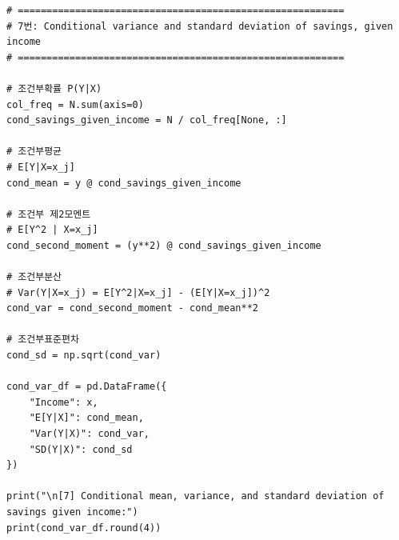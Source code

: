 \documentclass[12pt]{article}
\begin{document}
\begin{lstlisting}
# =========================================================
# 7번: Conditional variance and standard deviation of savings, given income
# =========================================================

# 조건부확률 P(Y|X)
col_freq = N.sum(axis=0)
cond_savings_given_income = N / col_freq[None, :]

# 조건부평균
# E[Y|X=x_j]
cond_mean = y @ cond_savings_given_income

# 조건부 제2모멘트
# E[Y^2 | X=x_j]
cond_second_moment = (y**2) @ cond_savings_given_income

# 조건부분산
# Var(Y|X=x_j) = E[Y^2|X=x_j] - (E[Y|X=x_j])^2
cond_var = cond_second_moment - cond_mean**2

# 조건부표준편차
cond_sd = np.sqrt(cond_var)

cond_var_df = pd.DataFrame({
    "Income": x,
    "E[Y|X]": cond_mean,
    "Var(Y|X)": cond_var,
    "SD(Y|X)": cond_sd
})

print("\n[7] Conditional mean, variance, and standard deviation of savings given income:")
print(cond_var_df.round(4))
\end{lstlisting}
\end{document}
